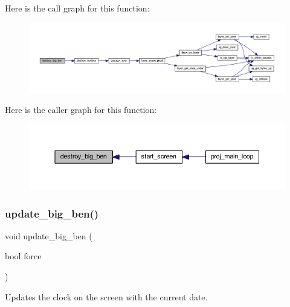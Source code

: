 Here is the call graph for this function\+:\nopagebreak
\begin{figure}[H]
\begin{center}
\leavevmode
\includegraphics[width=350pt]{group__clock_ga74cbf0ece67234028fdd0465d51bfc0d_cgraph}
\end{center}
\end{figure}
Here is the caller graph for this function\+:\nopagebreak
\begin{figure}[H]
\begin{center}
\leavevmode
\includegraphics[width=350pt]{group__clock_ga74cbf0ece67234028fdd0465d51bfc0d_icgraph}
\end{center}
\end{figure}
\mbox{\label{group__clock_gac56b75476d51e272a9efcbb174ed7bf8}} 
\subsubsection{\texorpdfstring{update\+\_\+big\+\_\+ben()}{update\_big\_ben()}}
{\footnotesize\ttfamily void update\+\_\+big\+\_\+ben (\begin{DoxyParamCaption}\item[{bool}]{force }\end{DoxyParamCaption})}



Updates the clock on the screen with the current date. 



